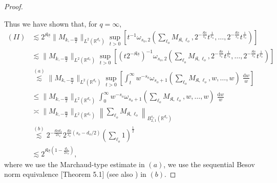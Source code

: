 \documentclass[11pt]{article}
\newcommand{\bl}{{\boldsymbol\ell}}
\newcommand{\0}{\mathbf{0}}
\begin{document}
\begin{appendix}
\begin{proof}
\begin{itemize}
\end{itemize}
Thus we have shown that, for $q=\infty$, 
\begin{align*}
    (II) &\lesssim 2^{\mathfrak{K}\underline{s}}\|M_{k,-\frac{\mathfrak{m}}{2}}\|_{L^2(\mathbb{R}^{d_x})}\sup_{t>0}\left[t^{-1}\omega_{s_o,2}\left(\sum_
    {\bl_o}M_{\mathfrak{K},\bl_o}, 2^{-\frac{\mathfrak{K}\underline{s}}{s_o}}t^{\frac{1}{s_o}},\dots, 2^{-\frac{\mathfrak{K}\underline{s}}{s_o}}t^{\frac{1}{s_o}}\right)\right]\\
    &\lesssim \|M_{k,-\frac{\mathfrak{m}}{2}}\|_{L^2(\mathbb{R}^{d_x})}\sup_{t>0}\left[\left(t2^{-\mathfrak{K}\underline{s}}\right)^{-1}\omega_{s_o,2}\left(\sum_
    {\bl_o}M_{\mathfrak{K},\bl_o}, 2^{-\frac{\mathfrak{K}\underline{s}}{s_o}}t^{\frac{1}{s_o}},\dots, 2^{-\frac{\mathfrak{K}\underline{s}}{s_o}}t^{\frac{1}{s_o}}\right)\right]\\
    &\stackrel{(a)}{\lesssim} \|M_{k,-\frac{\mathfrak{m}}{2}}\|_{L^2(\mathbb{R}^{d_x})}\sup_{t>0}\left[\int_{t}^{\infty} w^{-s_o}\omega_{s_o+1}\left(\sum_{\bl_o}M_{\mathfrak{K},\bl_o}, w,\dots,w\right)\;\frac{\mathrm{d}w}{w}\right]\\
    &\leq \|M_{k,-\frac{\mathfrak{m}}{2}}\|_{L^2(\mathbb{R}^{d_x})}\int_{0}^{\infty} w^{-s_o}\omega_{s_o+1}\left(\sum_{\bl_o}M_{\mathfrak{K},\bl_o}, w,\dots,w\right)\;\frac{\mathrm{d}w}{w}\\
    &\asymp \|M_{k,-\frac{\mathfrak{m}}{2}}\|_{L^2(\mathbb{R}^{d_x})}\left\|\sum_{\bl_o}M_{\mathfrak{K},\bl_o}\right\|_{B^{s_o}_{2,1}(\mathbb{R}^{d_o})}\\
    &\stackrel{(b)}{\lesssim} 2^{-\frac{\mathfrak{K}\underline{s}d_x}{2s_x}}2^{\frac{\mathfrak{K}\underline{s}}{s_o}(s_o - d_o/2)}\left(\sum_{\bl_o}1\right)^{\frac{1}{2}}\\
    &\lesssim 2^{\mathfrak{K}\underline{s}\left(1 - \frac{d_x}{2s_x}\right)},
\end{align*}
where we use the Marchaud-type estimate \citet[Chapter 2, Eq. (10.3)]{devore1993constructive} in $(a)$, we use the sequential Besov norm equivalence \cite{devore1988interpolation}[Theorem 5.1] (see also \citep[Theorem 3.3.3]{leisner_nonlinear_wavelet_approximation_2003}) in $(b)$. 
\end{proof}%
\end{appendix}
\end{document}
